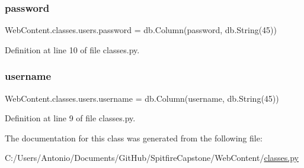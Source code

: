 \subsubsection{\texorpdfstring{password}{password}}
{\footnotesize\ttfamily Web\+Content.\+classes.\+users.\+password = db.\+Column(\textquotesingle{}password\textquotesingle{}, db.\+String(45))\hspace{0.3cm}{\ttfamily [static]}}



Definition at line 10 of file classes.\+py.

\mbox{\label{class_web_content_1_1classes_1_1users_afb64ef703cb89d0c372007783ca92878}} 
\subsubsection{\texorpdfstring{username}{username}}
{\footnotesize\ttfamily Web\+Content.\+classes.\+users.\+username = db.\+Column(\textquotesingle{}username\textquotesingle{}, db.\+String(45))\hspace{0.3cm}{\ttfamily [static]}}



Definition at line 9 of file classes.\+py.



The documentation for this class was generated from the following file\+:\begin{DoxyCompactItemize}
\item 
C\+:/\+Users/\+Antonio/\+Documents/\+Git\+Hub/\+Spitfire\+Capstone/\+Web\+Content/\hyperlink{classes_8py}{classes.\+py}\end{DoxyCompactItemize}

